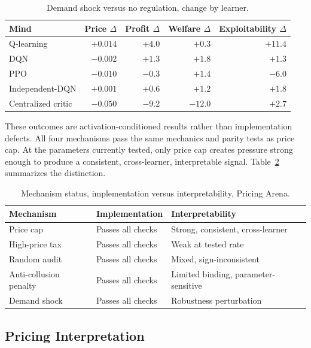 \documentclass[11pt]{article}
\begin{document}
\begin{table}[h]
\centering
\begin{tabular}{lrrrr}
\toprule
Mind & Price \(\Delta\) & Profit \(\Delta\) & Welfare \(\Delta\) & Exploitability \(\Delta\) \\
\midrule
Q-learning & \(+0.014\) & \(+4.0\) & \(+0.3\) & \(+11.4\) \\
DQN & \(-0.002\) & \(+1.3\) & \(+1.8\) & \(+1.3\) \\
PPO & \(-0.010\) & \(-0.3\) & \(+1.4\) & \(-6.0\) \\
Independent-DQN & \(+0.001\) & \(+0.6\) & \(+1.2\) & \(+1.8\) \\
Centralized critic & \(-0.050\) & \(-9.2\) & \(-12.0\) & \(+2.7\) \\
\bottomrule
\end{tabular}
\caption{Demand shock versus no regulation, change by learner.}
\label{tab:pricing-demandshock}
\end{table}

These outcomes are activation-conditioned results rather than
implementation defects. All four mechanisms pass the same mechanics and parity
tests as price cap. At the parameters currently tested, only price cap creates
pressure strong enough to produce a consistent, cross-learner, interpretable
signal. Table~\ref{tab:pricing-mechanism-status} summarizes the distinction.

\begin{table}[h]
\centering
\begin{tabular}{lll}
\toprule
Mechanism & Implementation & Interpretability \\
\midrule
Price cap & Passes all checks & Strong, consistent, cross-learner \\
High-price tax & Passes all checks & Weak at tested rate \\
Random audit & Passes all checks & Mixed, sign-inconsistent \\
Anti-collusion penalty & Passes all checks & Limited binding, parameter-sensitive \\
Demand shock & Passes all checks & Robustness perturbation \\
\bottomrule
\end{tabular}
\caption{Mechanism status, implementation versus interpretability, Pricing Arena.}
\label{tab:pricing-mechanism-status}
\end{table}

\subsection{Pricing Interpretation}
\end{document}
